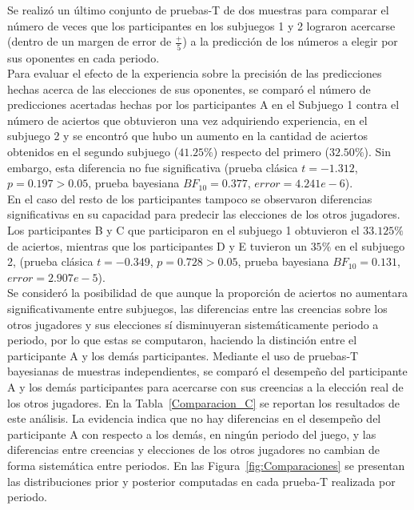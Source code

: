 Se realizó un último conjunto de pruebas-T de dos muestras para comparar el número de veces que los participantes en los subjuegos 1 y 2 lograron acercarse (dentro de un margen de error de $\frac{+}{5}$) a la predicción de los números a elegir por sus oponentes en cada periodo.\\

Para evaluar el efecto de la experiencia sobre la precisión de las predicciones hechas acerca de las elecciones de sus oponentes, se comparó el número de predicciones acertadas hechas por los participantes A en el Subjuego 1 contra el número de aciertos que obtuvieron una vez adquiriendo experiencia, en el subjuego 2 y se encontró que hubo un aumento en la cantidad de aciertos obtenidos en el segundo subjuego ($41.25\%$) respecto del primero ($32.50\%$). Sin embargo, esta diferencia no fue significativa (prueba clásica $t = -1.312$, $p = 0.197 > 0.05$, prueba bayesiana $BF_{10} = 0.377$, $error = 4.241e - 6$).\\

En el caso del resto de los participantes tampoco se observaron diferencias significativas en su capacidad para predecir las elecciones de los otros jugadores. Los participantes B y C que participaron en el subjuego 1 obtuvieron el $33.125\%$ de aciertos, mientras que los participantes D y E tuvieron un $35\%$ en el subjuego 2,  (prueba clásica $t = -0.349$, $p = 0.728 > 0.05$, prueba bayesiana $BF_{10} = 0.131$, $error = 2.907e - 5$).\\

Se consideró la posibilidad de que aunque la proporción de aciertos no aumentara significativamente entre subjuegos, las diferencias entre las creencias sobre los otros jugadores y sus elecciones sí disminuyeran sistemáticamente periodo a periodo, por lo que estas se computaron, haciendo la distinción entre  el participante A y los demás participantes. Mediante el uso de pruebas-T bayesianas de muestras independientes,  se comparó el desempeño del participante A y los demás participantes para acercarse con sus creencias a la elección real de los otros jugadores. En la Tabla~\ref{Comparacion_C} se reportan los resultados de este análisis. La evidencia indica que no hay diferencias en el desempeño del participante A con respecto a los demás, en ningún periodo del juego, y las diferencias entre creencias y elecciones de los otros jugadores no cambian de forma sistemática entre periodos. En las Figura~\ref{fig:Comparaciones} se presentan las distribuciones prior y posterior computadas en cada prueba-T realizada por periodo.\\

